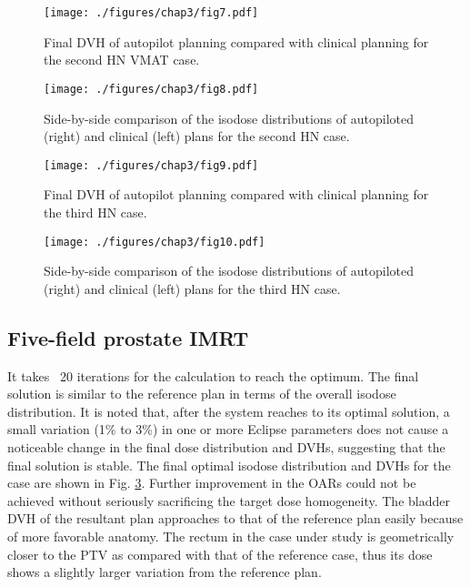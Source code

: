 \begin{figure}
	\centering
	\texttt{[image: ./figures/chap3/fig7.pdf]}
	\caption{Final DVH of autopilot planning compared with clinical planning for the second HN VMAT case. 
	\label{fig3.7}}
    \end{figure}

\begin{figure}
	\centering
	\texttt{[image: ./figures/chap3/fig8.pdf]}
	\caption{Side-by-side comparison of the isodose distributions of autopiloted (right) and clinical (left) plans for the second HN case. 
	\label{fig3.8}}
    \end{figure}

\begin{figure}
	\centering
	\texttt{[image: ./figures/chap3/fig9.pdf]}
	\caption{Final DVH of autopilot planning compared with clinical planning for the third HN case. 
	\label{fig3.9}}
    \end{figure}

\begin{figure}
	\centering
	\texttt{[image: ./figures/chap3/fig10.pdf]}
	\caption{Side-by-side comparison of the isodose distributions of autopiloted (right) and clinical (left) plans for the third HN case. 
	\label{fig3.10}}
    \end{figure}
            
\subsection{Five-field prostate IMRT}

It takes ~20 iterations for the calculation to reach the optimum. The final solution is similar to the reference plan in terms of the overall isodose distribution. It is noted that, after the system reaches to its optimal solution, a small variation (1\% to 3\%) in one or more Eclipse parameters does not cause a noticeable change in the final dose distribution and DVHs, suggesting that the final solution is stable. The final optimal isodose distribution and DVHs for the case are shown in Fig. \ref{fig3.9}. Further improvement in the OARs could not be achieved without seriously sacrificing the target dose homogeneity. The bladder DVH of the resultant plan approaches to that of the reference plan easily because of more favorable anatomy. The rectum in the case under study is geometrically closer to the PTV as compared with that of the reference case, thus its dose shows a slightly larger variation from the reference plan.

